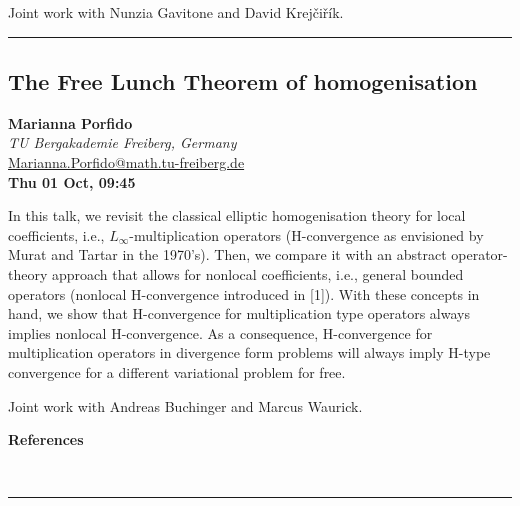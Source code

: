 \documentclass[a4paper,11pt]{article}
\begin{document}
\smallskip
Joint work with Nunzia Gavitone and David Krejčiřík.

\newpage

\noindent\rule{\textwidth}{0.4pt}

\begin{center}
\subsection*{The Free Lunch Theorem of homogenisation}

\textbf{Marianna Porfido} \\
\textit{TU Bergakademie Freiberg, Germany} \\
\url{Marianna.Porfido@math.tu-freiberg.de} \\
\textbf{Thu 01 Oct, 09:45}
\
\end{center}
\medskip
In this talk, we revisit the classical elliptic homogenisation theory for local coefficients, i.e., $L_\infty$-multiplication operators (H-convergence as envisioned by Murat and Tartar in the 1970's). Then, we compare it with an abstract operator-theory approach that allows for nonlocal coefficients, i.e., general bounded operators (nonlocal H-convergence introduced in [1]). With these concepts in hand, we show that H-convergence for multiplication type operators always implies nonlocal H-convergence. As a consequence, H-convergence for multiplication operators in divergence form problems will always imply H-type convergence for a different variational problem for free.

\smallskip
Joint work with Andreas Buchinger and Marcus Waurick.

\medskip

\begin{center} {\bf References} \end{center}

\\

\newpage

\noindent\rule{\textwidth}{0.4pt}
\end{document}
